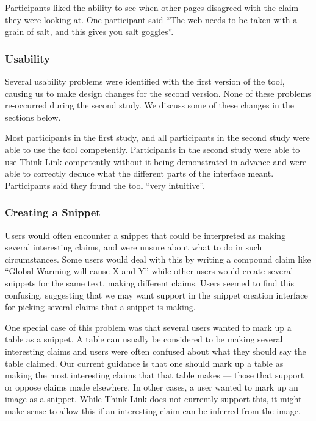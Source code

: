 \documentclass{chi2009}
\begin{document}
Participants liked the ability to see when other pages disagreed with the claim they were looking at. One participant said ``The web needs to be taken with a grain of salt, and this gives you salt goggles''.

\subsubsection{Usability}

Several usability problems were identified with the first version of the tool, causing us to make design changes for the second version. None of these problems re-occurred during the second study. We discuss some of these changes in the sections below.

Most participants in the first study, and all participants in the second study were able to use the tool competently. Participants in the second study were able to use Think Link competently without it being demonstrated in advance and were able to correctly deduce what the different parts of the interface meant. Participants said they found the tool ``very intuitive''.


\subsubsection{Creating a Snippet}

Users would often encounter a snippet that could be interpreted as making several interesting claims, and were unsure about what to do in such circumstances. Some users would deal with this by writing a compound claim like ``Global Warming will cause X and Y'' while other users would create several snippets for the same text, making different claims. Users seemed to find this confusing, suggesting that we may want support in the snippet creation interface for picking several claims that a snippet is making.

One special case of this problem was that several users wanted to mark up a table as a snippet. A table can usually be considered to be making several interesting claims and users were often confused about what they should say the table claimed. Our current guidance is that one should mark up a table as making the most interesting claims that that table makes --- those that support or oppose claims made elsewhere. In other cases, a user wanted to mark up an image as a snippet. While Think Link does not currently support this, it might make sense to allow this if an interesting claim can be inferred from the image.
\end{document}
